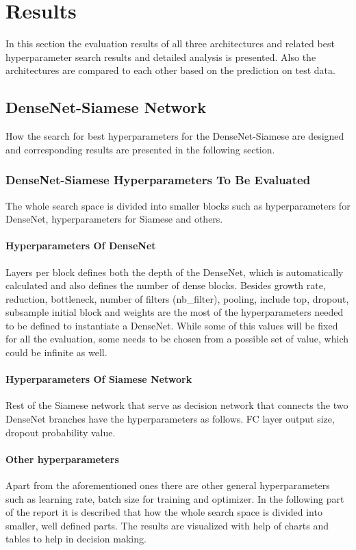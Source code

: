 
\chapter{Results}
\label{chap:results}

In this section the evaluation results of all three architectures and related best hyperparameter search results and detailed analysis is presented. Also the architectures are compared to each other based on the prediction on test data.

\section{DenseNet-Siamese Network}
How the search for best hyperparameters for the DenseNet-Siamese are designed and corresponding results are presented in the following section. 

\subsection{DenseNet-Siamese Hyperparameters To Be Evaluated}
The whole search space is divided into smaller blocks such as hyperparameters for DenseNet, hyperparameters for Siamese and others.
\subsubsection{Hyperparameters Of DenseNet}
\label{hyperDenseNet}
Layers per block defines both the depth of the DenseNet, which is automatically calculated and also defines the number of dense blocks. Besides growth rate, reduction, bottleneck, number of filters (nb\_filter), pooling,
include top, dropout, subsample initial block and weights are the most of the hyperparameters needed to be defined to instantiate a DenseNet. While some of this values will be fixed for all the evaluation, some needs to be 
chosen from a possible set of value, which could be infinite as well. 

\subsubsection{Hyperparameters Of Siamese Network}
Rest of the Siamese network that serve as decision network that connects the two DenseNet branches have the hyperparameters as follows. FC layer output size, dropout probability value.


\subsubsection{Other hyperparameters}
Apart from the aforementioned ones there are other general hyperparameters such as learning rate, batch size for training and optimizer. 
In the following part of the report it is described that how the whole search space is divided into smaller, well defined parts. The results are visualized with help of charts and tables to help in decision making.

